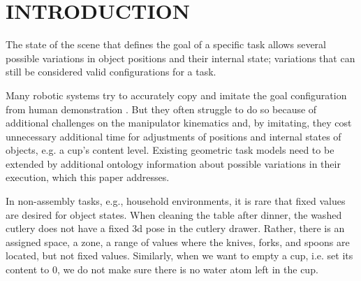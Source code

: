 \section{INTRODUCTION}

The state of the scene that defines the goal of a specific task allows several possible variations in object positions and their internal state; variations that can still be considered valid configurations for a task. 

Many robotic systems try to accurately copy and imitate the goal configuration from human demonstration \cite{dobbe_immitationLearning, whirl_immitationLearning, mime_immitationLearning}. But they often struggle to do so because of additional challenges on the manipulator kinematics and, by imitating, they cost unnecessary additional time for adjustments of positions and internal states of objects, e.g. a cup's content level. Existing geometric task models \cite{taskLearning_trajectories} need to be extended by additional ontology information about possible variations in their execution, which this paper addresses.



In non-assembly tasks, e.g., household environments, it is rare that fixed values are desired for object states. 
When cleaning the table after dinner, the washed cutlery does not have a fixed 3d pose in the cutlery drawer. Rather, there is an assigned space, a zone, a range of values where the knives, forks, and spoons are located, but not fixed values. 
Similarly, when we want to empty a cup, i.e. set its content to 0, we do not make sure there is no water atom left in the cup.


